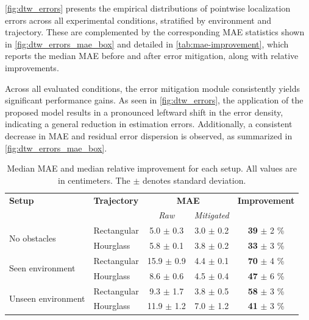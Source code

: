 \autoref{fig:dtw_errors} presents the empirical distributions of pointwise localization errors across all experimental conditions, stratified by environment and trajectory. These are complemented by the corresponding MAE statistics shown in \autoref{fig:dtw_errors_mae_box} and detailed in \autoref{tab:mae-improvement}, which reports the median MAE before and after error mitigation, along with relative improvements.

Across all evaluated conditions, the error mitigation module consistently yields significant performance gains. As seen in \autoref{fig:dtw_errors}, the application of the proposed model results in a pronounced leftward shift in the error density, indicating a general reduction in estimation errors. Additionally, a consistent decrease in MAE and residual error dispersion is observed, as summarized in \autoref{fig:dtw_errors_mae_box}.

\begin{table}[tbh]
\centering
\caption[Median error and median relative improvement for each setup.]{Median MAE and median relative improvement for each setup. All values are in centimeters. The $\pm$ denotes standard deviation.}
\label{tab:mae-improvement}
\begin{tabular}{llccc}
\toprule
\textbf{Setup} & \textbf{Trajectory} & \multicolumn{2}{c}{\textbf{MAE}} & \textbf{Improvement} \\
\cmidrule(lr){3-4}
 & & \textit{Raw} & \textit{Mitigated} & \\
\midrule
\multirow{2}{*}{No obstacles} 
  & Rectangular &  5.0 $\pm$ 0.3 & 3.0 $\pm$ 0.2 & \textbf{39} $\pm$ 2 \% \\
  & Hourglass   &  5.8 $\pm$ 0.1 & 3.8 $\pm$ 0.2 & \textbf{33} $\pm$ 3 \% \\
\midrule
\multirow{2}{*}{Seen environment} 
  & Rectangular & 15.9 $\pm$ 0.9 & 4.4 $\pm$ 0.1 & \textbf{70} $\pm$ 4 \% \\
  & Hourglass   &  8.6 $\pm$ 0.6 & 4.5 $\pm$ 0.4 & \textbf{47} $\pm$ 6 \% \\
\midrule
\multirow{2}{*}{Unseen environment} 
  & Rectangular &  9.3 $\pm$ 1.7 & 3.8 $\pm$ 0.5 & \textbf{58} $\pm$ 3 \% \\
  & Hourglass   & 11.9 $\pm$ 1.2 & 7.0 $\pm$ 1.2 & \textbf{41} $\pm$ 3 \% \\
\bottomrule
\end{tabular}
\end{table}

